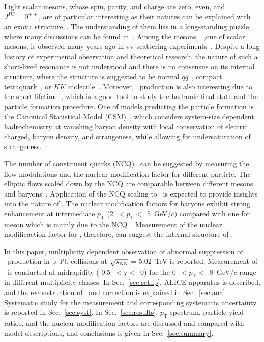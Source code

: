 Light scalar mesons, whose spin, parity, and charge are zero, even, and $J^{PC} = 0^{++}$, are of particular interesting as their natures can be explained with an exotic structure~\cite{ParticleDataGroup:2020ssz}. The understanding of them lies in a long-standing puzzle, where many discussions can be found in~\cite{ExHIC:2010gcb, Jaffe:1976ig, Maiani:2004uc}. Among the mesons, \fzero~,one of scalar mesons, is observed many years ago in $\pi\pi$ scattering experiments~\cite{Mennessier:2010xz}. Despite a long history of experimental observation and theoretical research, the nature of such a short-lived resonance is not understood and there is no consensus on its internal structure, where the structure is suggested to be normal $q\bar{q}$~\cite{Chen:2003za}, compact tetraquark~\cite{Achasov:2020aun}, or $K\overline{K}$ molecule~\cite{Ahmed:2020kmp}. Moreover, \fzero~production is also interesting due to the short lifetime~\cite{ParticleDataGroup:2020ssz}, which is a good tool to study the hadronic final state and the particle formation procedure. One of models predicting the particle formation is the Canonical Statistical Model (CSM)~\cite{Vovchenko:2019kes}, which considers system-size dependent hadrochemistry at vanishing baryon density with local conservation of electric charged, baryon density, and strangeness, while allowing for undersaturation of strangeness.

The number of constituent quarks (NCQ)~\cite{Fries:2003vb} can be suggested by measuring the flow modulations and the nuclear modification factor for different particle. The elliptic flows scaled down by the NCQ are comparable between different mesons and baryons~\cite{Wang:2022det}. Application of the NCQ scaling to \fzero~is expected to provide insights into the nature of \fzero. The nuclear modification factors for baryons exhibit strong enhancement at intermediate $p_{\mathrm{T}}$ (2~$<p_{\mathrm{T}}<$~5~GeV/$c$) compared with one for meson which is mainly due to the NCQ~\cite{Cronin:1974zm}. Measurement of the nuclear modificaction factor for \fzero, therefore, can suggest the internal structure of \fzero.

In this paper, multiplicity dependent observation of abnormal suppression of \fzero~production in p--Pb collisions at $\sqrt{s_{\rm NN}}$ = 5.02~TeV is reported. Measurement of \fzero~is conducted at midrapidity (-0.5~$<\mathrm{y}<$~0) for the 0~$<p_{\mathrm{T}}<$~8~GeV/$c$ range in different multiplicity classes. In Sec.~\ref{sec:setup}, ALICE apparatus is described, and the reconstruction of \fzero~and correction is explained in Sec.~\ref{sec:ana}. Systematic study for the measurement and corresponding systematic uncertainty is reported in Sec.~\ref{sec:syst}. In Sec.~\ref{sec:results}, $p_{\mathrm{T}}$ spectrum, particle yield ratios, and the nuclear modification factors are discussed and compared with model descriptions, and conclusions is given in Sec.~\ref{sec:summary}.

\label{sec:intro}




